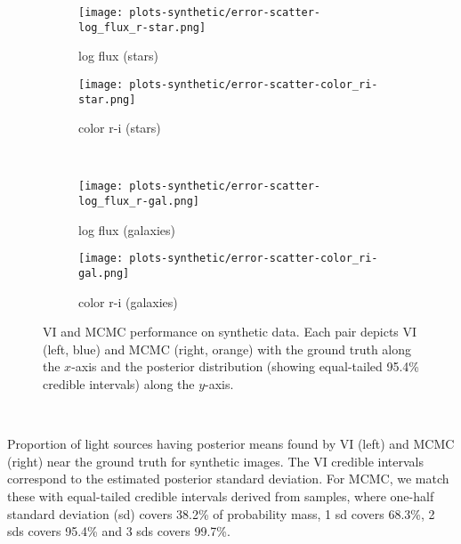 \begin{figure}
\begin{floatrow}
\end{floatrow}
\end{figure}

\begin{figure}
\centering
\begin{subfigure}{.49\textwidth}
  \centering
  \texttt{[image: plots-synthetic/error-scatter-log\_flux\_r-star.png]}
  \caption{log flux (stars)}
\end{subfigure}
\begin{subfigure}{.49\textwidth}
  \centering
  \texttt{[image: plots-synthetic/error-scatter-color\_ri-star.png]}
  \caption{color r-i (stars)}
\end{subfigure}
\\
\begin{subfigure}{.49\textwidth}
  \centering
  \texttt{[image: plots-synthetic/error-scatter-log\_flux\_r-gal.png]}
  \caption{log flux (galaxies)}
\end{subfigure}
\begin{subfigure}{.49\textwidth}
  \centering
  \texttt{[image: plots-synthetic/error-scatter-color\_ri-gal.png]}
  \caption{color r-i (galaxies)}
\end{subfigure}
\caption{VI and MCMC performance on synthetic data.  Each pair depicts VI (left, blue) and MCMC (right, orange) with the ground truth along the $x$-axis and the posterior distribution (showing equal-tailed 95.4\% credible intervals) along the $y$-axis.}
\label{qq-synth}
\end{figure}

\begin{table}[b]
\scalebox{.75}{

}~
\scalebox{.75}{

}
\vspace{.5em}
\caption{
Proportion of light sources having posterior means found by VI (left) and MCMC (right) near the ground truth for synthetic images.
The VI credible intervals correspond to the estimated posterior standard deviation.
For MCMC, we match these with equal-tailed credible intervals derived from samples, where one-half standard deviation (sd) covers 38.2\% of probability mass, 1 sd covers 68.3\%, 2 sds covers 95.4\% and 3 sds covers 99.7\%.}
\label{tab:calibration-synth}
\end{table}

